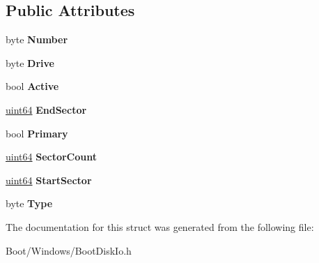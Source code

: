 \subsection*{Public Attributes}
\begin{DoxyCompactItemize}
\item 
\mbox{\label{struct_partition_aada0b73a8240a133b417bf1bc386c547}} 
byte {\bfseries Number}
\item 
\mbox{\label{struct_partition_ac6b99a4ad5900fa7758db520bacee00c}} 
byte {\bfseries Drive}
\item 
\mbox{\label{struct_partition_ab886109efe9a7da700e00d79147c8104}} 
bool {\bfseries Active}
\item 
\mbox{\label{struct_partition_abf656e794ce0a7c93242468310457efc}} 
\hyperlink{union_u_i_n_t64___s_t_r_u_c_t}{uint64} {\bfseries End\+Sector}
\item 
\mbox{\label{struct_partition_a6bde7c29be1c5b68f89350899b8b0731}} 
bool {\bfseries Primary}
\item 
\mbox{\label{struct_partition_a67e3de9d8112e44a144c231e7335898e}} 
\hyperlink{union_u_i_n_t64___s_t_r_u_c_t}{uint64} {\bfseries Sector\+Count}
\item 
\mbox{\label{struct_partition_a619e7a6ac53ba5caf6f7328c0c465463}} 
\hyperlink{union_u_i_n_t64___s_t_r_u_c_t}{uint64} {\bfseries Start\+Sector}
\item 
\mbox{\label{struct_partition_a851cf88298f687daa8d0dc072e550b1b}} 
byte {\bfseries Type}
\end{DoxyCompactItemize}


The documentation for this struct was generated from the following file\+:\begin{DoxyCompactItemize}
\item 
Boot/\+Windows/Boot\+Disk\+Io.\+h\end{DoxyCompactItemize}
